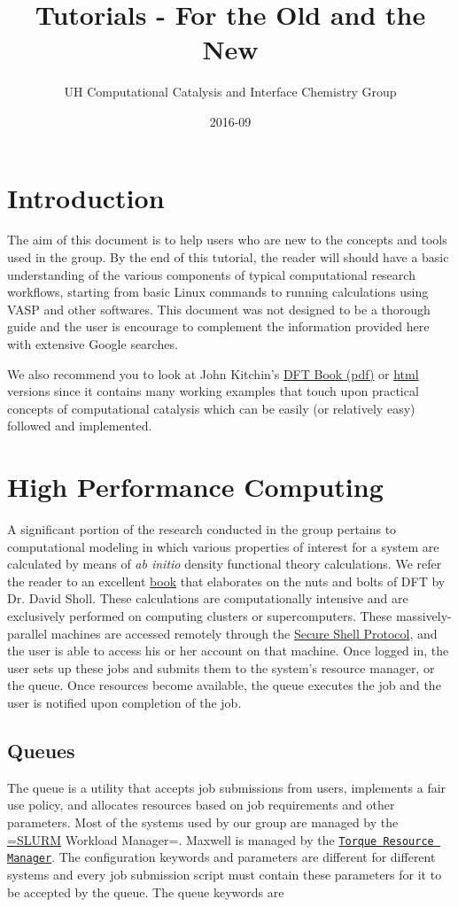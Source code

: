 \documentclass[11pt]{article}
\author{UH Computational Catalysis and Interface Chemistry Group}
\date{2016-09}
\title{Tutorials - For the Old and the New}
\begin{document}
\tableofcontents


\section{Introduction}
\label{sec-1}
The aim of this document is to help users who are new to the concepts and tools used in the group. By the end of this tutorial, the reader will should have a basic understanding of the various components of typical computational research workflows, starting from basic Linux commands to running calculations using VASP and other softwares. This document was not designed to be a thorough guide and the user is encourage to complement the information provided here with extensive Google searches.

We also recommend you to look at John Kitchin's \href{http://kitchingroup.cheme.cmu.edu/dft-book/dft.pdf}{DFT Book (pdf)} or \href{http://kitchingroup.cheme.cmu.edu/dft-book/dft.html}{html} versions since it contains many working examples that touch upon practical concepts of computational catalysis which can be easily (or relatively easy) followed and implemented.

\section{High Performance Computing}
\label{sec-2}
A significant portion of the research conducted in the group pertains to computational modeling in which various properties of interest for a system are calculated by means of \emph{ab initio} density functional theory calculations. We refer the reader to an excellent \href{https://www.wiley.com/en-us/Density+Functional+Theory\%3A+A+Practical+Introduction-p-9780470373170}{book} that elaborates on the nuts and bolts of DFT by Dr. David Sholl. These calculations are computationally intensive and are exclusively performed on computing clusters or supercomputers. These massively-parallel machines are accessed remotely through the \href{https://www.ssh.com/ssh/protocol/}{Secure Shell Protocol}, and the user is able to access his or her account on that machine. Once logged in, the user sets up these jobs and submits them to the system's resource manager, or the queue. Once resources become available, the queue executes the job and the user is notified upon completion of the job.

\subsection{Queues}
\label{sec-2-1}
The queue is a utility that accepts job submissions from users, implements a fair use policy, and allocates resources based on job requirements and other parameters. Most of the systems used by our group are managed by the \href{http://slurm.schedmd.com/}{=SLURM} Workload Manager=. Maxwell is managed by the \href{http://www.adaptivecomputing.com/products/open-source/torque/}{\texttt{Torque Resource Manager}}. The configuration keywords and parameters are different for different systems and every job submission script must contain these parameters for it to be accepted by the queue. The queue keywords are
\end{document}
